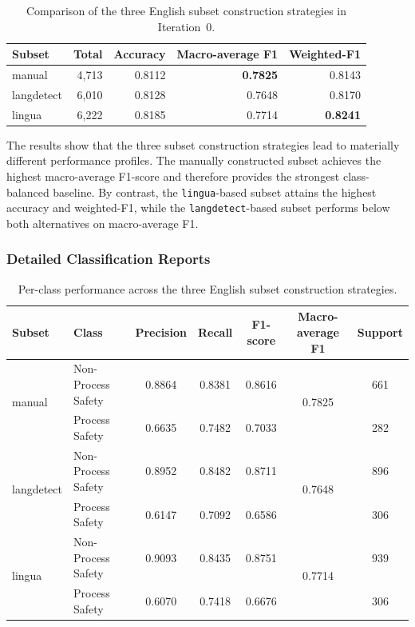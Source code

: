\documentclass[11pt, titlepage, bibliography=totoc]{scrreprt}
\begin{document}
\begin{table}[h!]
\centering
\caption{Comparison of the three English subset construction strategies in Iteration~0.}
\label{tab:iter0_comparison_summary}
\begin{tabular}{lrrrr}
\toprule
\textbf{Subset} & \textbf{Total} & \textbf{Accuracy} & \textbf{Macro-average F1} & \textbf{Weighted-F1} \\
\midrule
manual     & 4,713 & 0.8112 & \textbf{0.7825} & 0.8143 \\
langdetect & 6,010 & 0.8128 & 0.7648 & 0.8170 \\
lingua     & 6,222 & 0.8185 & 0.7714 & \textbf{0.8241} \\
\bottomrule
\end{tabular}
\end{table}

The results show that the three subset construction strategies lead to materially different performance profiles. The manually constructed subset achieves the highest macro-average F1-score and therefore provides the strongest class-balanced baseline. By contrast, the \texttt{lingua}-based subset attains the highest accuracy and weighted-F1, while the \texttt{langdetect}-based subset performs below both alternatives on macro-average F1.

\subsubsection{Detailed Classification Reports}

\begin{table}[h!]
\centering
\caption{Per-class performance across the three English subset construction strategies.}
\label{tab:iter0_per_class_metrics}
\begin{tabular}{llccccc}
\toprule
\textbf{Subset} & \textbf{Class} & \textbf{Precision} & \textbf{Recall} & \textbf{F1-score} & \textbf{Macro-average F1} & \textbf{Support} \\
\midrule
\multirow{2}{*}{manual}
    & Non-Process Safety & 0.8864 & 0.8381 & 0.8616 & \multirow{2}{*}{0.7825} & 661 \\
    & Process Safety     & 0.6635 & 0.7482 & 0.7033 &  & 282 \\
\midrule
\multirow{2}{*}{langdetect}
    & Non-Process Safety & 0.8952 & 0.8482 & 0.8711 & \multirow{2}{*}{0.7648} & 896 \\
    & Process Safety     & 0.6147 & 0.7092 & 0.6586 &  & 306 \\
\midrule
\multirow{2}{*}{lingua}
    & Non-Process Safety & 0.9093 & 0.8435 & 0.8751 & \multirow{2}{*}{0.7714} & 939 \\
    & Process Safety     & 0.6070 & 0.7418 & 0.6676 &  & 306 \\
\bottomrule
\end{tabular}
\end{table}
\end{document}
